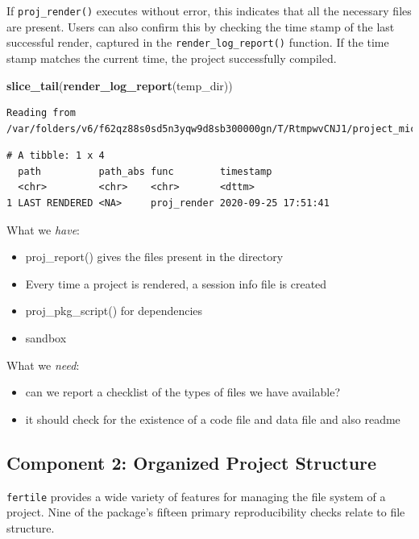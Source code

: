 \documentclass[12pt,twoside]{reedthesis}
\newenvironment{Shaded}{\begin{snugshade}}{\end{snugshade}}
\newcommand{\KeywordTok}[1]{\textcolor[rgb]{0.13,0.29,0.53}{\textbf{#1}}}
\newcommand{\NormalTok}[1]{#1}
\providecommand{\tightlist}{%
  \setlength{\itemsep}{0pt}\setlength{\parskip}{0pt}}
\begin{document}
If \texttt{proj\_render()} executes without error, this indicates that
all the necessary files are present. Users can also confirm this by
checking the time stamp of the last successful render, captured in the
\texttt{render\_log\_report()} function. If the time stamp matches the
current time, the project successfully compiled.

\footnotesize
\begin{Shaded}
\begin{Highlighting}[]
\KeywordTok{slice_tail}\NormalTok{(}\KeywordTok{render_log_report}\NormalTok{(temp_dir))}
\end{Highlighting}
\end{Shaded}
\begin{verbatim}
Reading from /var/folders/v6/f62qz88s0sd5n3yqw9d8sb300000gn/T/RtmpwvCNJ1/project_miceps/.fertile_render_log.csv
\end{verbatim}
\begin{verbatim}
# A tibble: 1 x 4
  path          path_abs func        timestamp          
  <chr>         <chr>    <chr>       <dttm>             
1 LAST RENDERED <NA>     proj_render 2020-09-25 17:51:41
\end{verbatim}
\normalsize

What we \emph{have}:
\begin{itemize}
\tightlist
\item
  proj\_report() gives the files present in the directory
\item
  Every time a project is rendered, a session info file is created
\item
  proj\_pkg\_script() for dependencies
\item
  sandbox
\end{itemize}
What we \emph{need}:
\begin{itemize}
\tightlist
\item
  can we report a checklist of the types of files we have available?
\item
  it should check for the existence of a code file and data file and
  also readme
\end{itemize}
\subsection{Component 2: Organized Project
Structure}\label{component-2-organized-project-structure}

\texttt{fertile} provides a wide variety of features for managing the
file system of a project. Nine of the package's fifteen primary
reproducibility checks relate to file structure.
\end{document}
